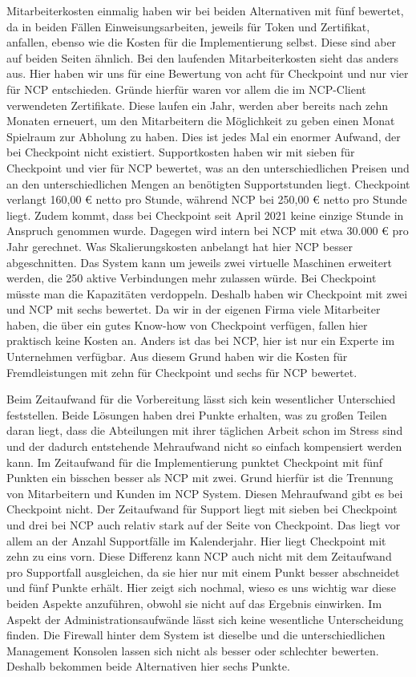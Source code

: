 Mitarbeiterkosten einmalig haben wir bei beiden Alternativen mit fünf bewertet, da in beiden Fällen Einweisungsarbeiten, jeweils für Token und Zertifikat, anfallen, ebenso wie die Kosten für die Implementierung selbst. Diese sind aber auf beiden Seiten ähnlich. Bei den laufenden Mitarbeiterkosten sieht das anders aus. Hier haben wir uns für eine Bewertung von acht für Checkpoint und nur vier für NCP entschieden. Gründe hierfür waren vor allem die im NCP-Client verwendeten Zertifikate. Diese laufen ein Jahr, werden aber bereits nach zehn Monaten erneuert, um den Mitarbeitern die Möglichkeit zu geben einen Monat Spielraum zur Abholung zu haben. Dies ist jedes Mal ein enormer Aufwand, der bei Checkpoint nicht existiert. Supportkosten haben wir mit sieben für Checkpoint und vier für NCP bewertet, was an den unterschiedlichen Preisen und an den unterschiedlichen Mengen an benötigten Supportstunden liegt. Checkpoint verlangt 160,00 € netto pro Stunde, während NCP bei 250,00 € netto pro Stunde liegt. Zudem kommt, dass bei Checkpoint seit April 2021 keine einzige Stunde in Anspruch genommen wurde. Dagegen wird intern bei NCP mit etwa 30.000 € pro Jahr gerechnet. Was Skalierungskosten anbelangt hat hier NCP besser abgeschnitten. Das System kann um jeweils zwei virtuelle Maschinen erweitert werden, die 250 aktive Verbindungen mehr zulassen würde. Bei Checkpoint müsste man die Kapazitäten verdoppeln. Deshalb haben wir Checkpoint mit zwei und NCP mit sechs bewertet. Da wir in der eigenen Firma viele Mitarbeiter haben, die über ein gutes Know-how von Checkpoint verfügen, fallen hier praktisch keine Kosten an. Anders ist das bei NCP, hier ist nur ein Experte im Unternehmen verfügbar. Aus diesem Grund haben wir die Kosten für Fremdleistungen mit zehn für Checkpoint und sechs für NCP bewertet.

Beim Zeitaufwand für die Vorbereitung lässt sich kein wesentlicher Unterschied feststellen. Beide Lösungen haben drei Punkte erhalten, was zu großen Teilen daran liegt, dass die Abteilungen mit ihrer täglichen Arbeit schon im Stress sind und der dadurch entstehende Mehraufwand nicht so einfach kompensiert werden kann. Im Zeitaufwand für die Implementierung punktet Checkpoint mit fünf Punkten ein bisschen besser als NCP mit zwei. Grund hierfür ist die Trennung von Mitarbeitern und Kunden im NCP System. Diesen Mehraufwand gibt es bei Checkpoint nicht. Der Zeitaufwand für Support liegt mit sieben bei Checkpoint und drei bei NCP auch relativ stark auf der Seite von Checkpoint. Das liegt vor allem an der Anzahl Supportfälle im Kalenderjahr. Hier liegt Checkpoint mit zehn zu eins vorn. Diese Differenz kann NCP auch nicht mit dem Zeitaufwand pro Supportfall ausgleichen, da sie hier nur mit einem Punkt besser abschneidet und fünf Punkte erhält. Hier zeigt sich nochmal, wieso es uns wichtig war diese beiden Aspekte anzuführen, obwohl sie nicht auf das Ergebnis einwirken. Im Aspekt der Administrationsaufwände lässt sich keine wesentliche Unterscheidung finden. Die Firewall hinter dem System ist dieselbe und die unterschiedlichen Management Konsolen lassen sich nicht als besser oder schlechter bewerten. Deshalb bekommen beide Alternativen hier sechs Punkte.


